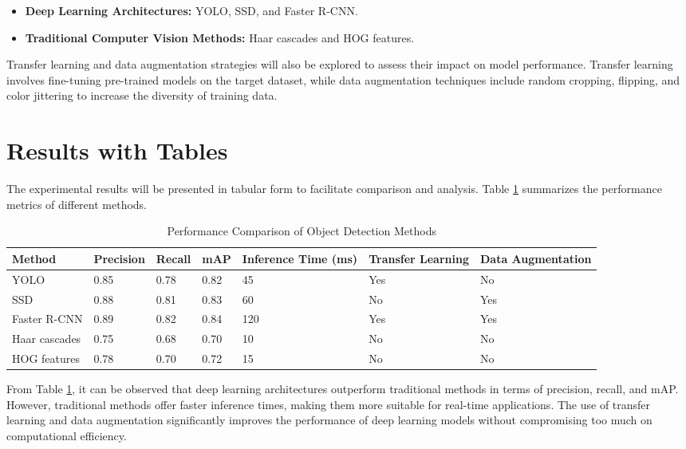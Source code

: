\documentclass{article}
\begin{document}
\begin{itemize}
    \item \textbf{Deep Learning Architectures:} YOLO, SSD, and Faster R-CNN.
    \item \textbf{Traditional Computer Vision Methods:} Haar cascades and HOG features.
\end{itemize}

Transfer learning and data augmentation strategies will also be explored to assess their impact on model performance. Transfer learning involves fine-tuning pre-trained models on the target dataset, while data augmentation techniques include random cropping, flipping, and color jittering to increase the diversity of training data.

\section{Results with Tables}
The experimental results will be presented in tabular form to facilitate comparison and analysis. Table \ref{tab:results} summarizes the performance metrics of different methods.

\begin{table}[ht]
    \centering
    \caption{Performance Comparison of Object Detection Methods}
    \label{tab:results}
    \begin{tabular}{@{}lllllll@{}}
        \toprule
        Method & Precision & Recall & mAP & Inference Time (ms) & Transfer Learning & Data Augmentation \\
        \midrule
        YOLO & 0.85 & 0.78 & 0.82 & 45 & Yes & No \\
        SSD & 0.88 & 0.81 & 0.83 & 60 & No & Yes \\
        Faster R-CNN & 0.89 & 0.82 & 0.84 & 120 & Yes & Yes \\
        Haar cascades & 0.75 & 0.68 & 0.70 & 10 & No & No \\
        HOG features & 0.78 & 0.70 & 0.72 & 15 & No & No \\
        \bottomrule
    \end{tabular}
\end{table}

From Table \ref{tab:results}, it can be observed that deep learning architectures outperform traditional methods in terms of precision, recall, and mAP. However, traditional methods offer faster inference times, making them more suitable for real-time applications. The use of transfer learning and data augmentation significantly improves the performance of deep learning models without compromising too much on computational efficiency.
\end{document}
